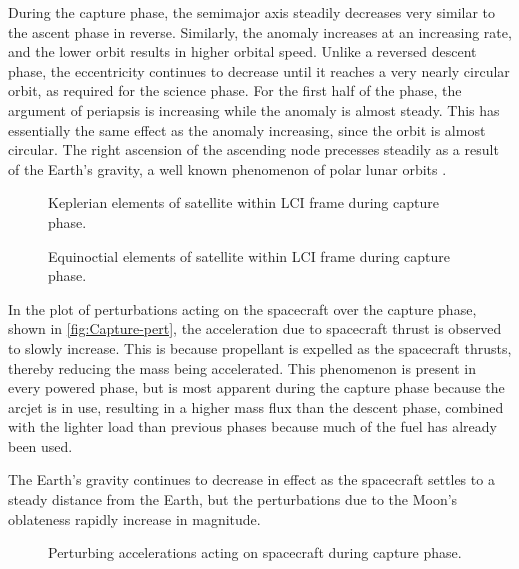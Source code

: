 During the capture phase, the semimajor axis steadily decreases very similar to the ascent phase in reverse. Similarly, the anomaly increases at an increasing rate, and the lower orbit results in higher orbital speed. Unlike a reversed descent phase, the eccentricity continues to decrease until it reaches a very nearly circular orbit, as required for the science phase. For the first half of the phase, the argument of periapsis is increasing while the anomaly is almost steady. This has essentially the same effect as the anomaly increasing, since the orbit is almost circular. The right ascension of the ascending node precesses steadily as a result of the Earth's gravity, a well known phenomenon of polar lunar orbits \parencite{Gupta2011}. %

\begin{figure}
\centering
\def\svgwidth{\figurewidth}

\caption{Keplerian elements of satellite within LCI frame during capture phase.} \label{fig:Capture-kep-lci}
\end{figure}

\begin{figure}
\centering
\def\svgwidth{\figurewidth}

\caption{Equinoctial elements of satellite within LCI frame during capture phase.} \label{fig:Capture-mee}
\end{figure}

In the plot of perturbations acting on the spacecraft over the capture phase, shown in \autoref{fig:Capture-pert}, the acceleration due to spacecraft thrust is observed to slowly increase. This is because propellant is expelled as the spacecraft thrusts, thereby reducing the mass being accelerated. This phenomenon is present in every powered phase, but is most apparent during the capture phase because the arcjet is in use, resulting in a higher mass flux than the descent phase, combined with the lighter load than previous phases because much of the fuel has already been used.

The Earth's gravity continues to decrease in effect as the spacecraft settles to a steady distance from the Earth, but the perturbations due to the Moon's oblateness rapidly increase in magnitude. 

\begin{figure}
\centering
\def\svgwidth{\figurewidth}

\caption{Perturbing accelerations acting on spacecraft during capture phase.} \label{fig:Capture-pert}
\end{figure}

